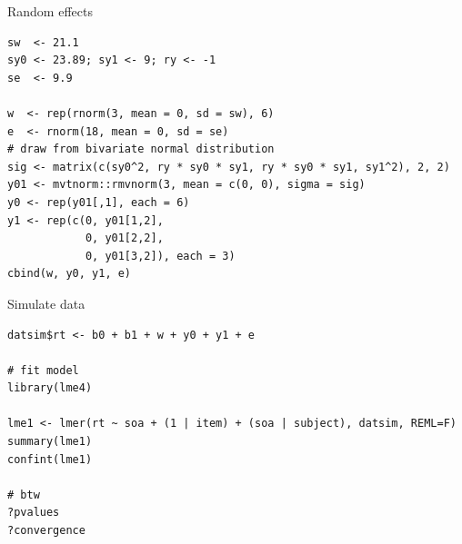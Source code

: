 \documentclass[aspectratio=169]{beamer}
\begin{document}
\begin{frame}[fragile]{Random effects}
  \begin{lstlisting}
sw  <- 21.1
sy0 <- 23.89; sy1 <- 9; ry <- -1
se  <- 9.9

w  <- rep(rnorm(3, mean = 0, sd = sw), 6)
e  <- rnorm(18, mean = 0, sd = se)
# draw from bivariate normal distribution
sig <- matrix(c(sy0^2, ry * sy0 * sy1, ry * sy0 * sy1, sy1^2), 2, 2)
y01 <- mvtnorm::rmvnorm(3, mean = c(0, 0), sigma = sig)
y0 <- rep(y01[,1], each = 6)
y1 <- rep(c(0, y01[1,2],
            0, y01[2,2],
            0, y01[3,2]), each = 3)
cbind(w, y0, y1, e)
  \end{lstlisting}
\end{frame}

\begin{frame}[fragile]{Simulate data}
  \begin{lstlisting}
datsim$rt <- b0 + b1 + w + y0 + y1 + e

# fit model
library(lme4)

lme1 <- lmer(rt ~ soa + (1 | item) + (soa | subject), datsim, REML=F)
summary(lme1)
confint(lme1)

# btw
?pvalues
?convergence
  \end{lstlisting}
\end{frame}

% 
\end{document}
